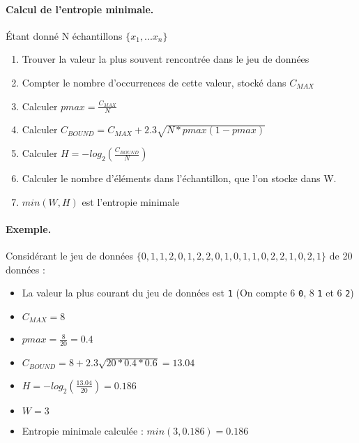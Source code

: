 \paragraph{Calcul de l'entropie minimale.\\}
Étant donné N échantillons $\lbrace x_1, ... x_n \rbrace$
\begin{enumerate}
\item Trouver la valeur la plus souvent rencontrée dans le jeu de données
\item Compter le nombre d’occurrences de cette valeur, stocké dans $C_{MAX}$
\item Calculer $pmax= \frac{C_{MAX}}{N}$
\item Calculer $C_{BOUND} = C_{MAX} + 2.3 \sqrt{N*pmax(1-pmax)} $
\item Calculer $ H = -log_2(\frac{C_{BOUND}}{N})$
\item Calculer le nombre d'éléments dans l'échantillon, que l'on stocke dans W. 
\item $min(W,H)$ est l'entropie minimale
\end{enumerate}


\paragraph{Exemple.\\}
Considérant le jeu de données $\lbrace 0,1,1,2,0,1,2,2,0,1,0,1,1,0,2,2,1,0,2,1 \rbrace$ de 20 données :
\begin{itemize}
\item La valeur la plus courant du jeu de données est \texttt{1} (On compte 6 \texttt{0}, 8 \texttt{1} et 6 \texttt{2})
\item $C_{MAX} = 8$
\item $pmax = \frac{8}{20} = 0.4$
\item $ C_{BOUND} = 8 + 2.3 \sqrt{20*0.4*0.6} = 13.04$
\item $ H = -log_2(\frac{13.04}{20}) = 0.186$
\item $ W = 3$
\item Entropie minimale calculée : $ min(3,0.186) = 0.186$
\end{itemize}

